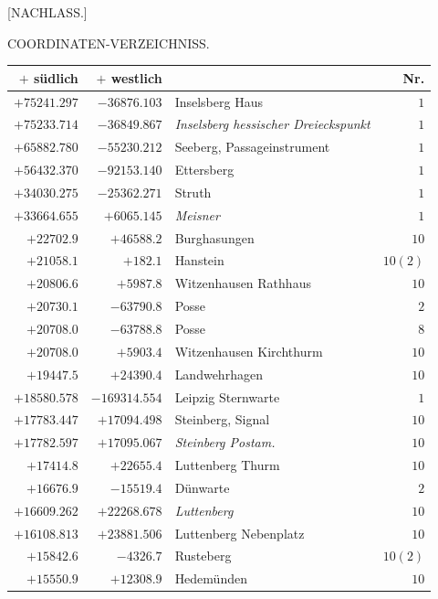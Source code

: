 \clearpage{}%
\begin{center}[NACHLASS.]\par\bigskip COORDINATEN-VERZEICHNISS.\end{center}
\begin{center}\begingroup\fontsize{8}{9}\selectfont
\setlength{\tabcolsep}{4pt}
\begin{tabular}{r|r|p{170pt}|r}\hline
\(+\) südlich&\(+\) westlich&&Nr.\\\hline
\(+75241.297\)&\(-36876.103\)&Inselsberg Haus&\(1\)\\
\(+75233.714\)&\(-36849.867\)&\textit{Inselsberg hessischer Dreieckspunkt}&\(1\)\\
\(+65882.780\)&\(-55230.212\)&Seeberg, Passageinstrument&\(1\)\\
\(+56432.370\)&\(-92153.140\)&Ettersberg&\(1\)\\
\(+34030.275\)&\(-25362.271\)&Struth&\(1\)\\
\(+33664.655\)&\(+6065.145\)&\textit{Meisner}&\(1\)\\
\(+22702.9\)&\(+46588.2\)&Burghasungen&\(10\)\\
\(+21058.1\)&\(+182.1\)&Hanstein&\(10(2)\)\\
\(+20806.6\)&\(+5987.8\)&Witzenhausen Rathhaus&\(10\)\\
\(+20730.1\)&\(-63790.8\)&Posse&\(2\)\\
\(+20708.0\)&\(-63788.8\)&Posse&\(8\)\\
\(+20708.0\)&\(+5903.4\)&Witzenhausen Kirchthurm&\(10\)\\
\(+19447.5\)&\(+24390.4\)&Landwehrhagen&\(10\)\\
\(+18580.578\)&\(-169314.554\)&Leipzig Sternwarte&\(1\)\\
\(+17783.447\)&\(+17094.498\)&Steinberg, Signal&\(10\)\\
\(+17782.597\)&\(+17095.067\)&\textit{Steinberg Postam.}&\(10\)\\
\(+17414.8\)&\(+22655.4\)&Luttenberg Thurm&\(10\)\\
\(+16676.9\)&\(-15519.4\)&Dünwarte&\(2\)\\
\(+16609.262\)&\(+22268.678\)&\textit{Luttenberg}&\(10\)\\
\(+16108.813\)&\(+23881.506\)&Luttenberg Nebenplatz&\(10\)\\
\(+15842.6\)&\(-4326.7\)&Rusteberg&\(10(2)\)\\
\(+15550.9\)&\(+12308.9\)&Hedemünden&\(10\)\\

\end{tabular}
\end{center}
